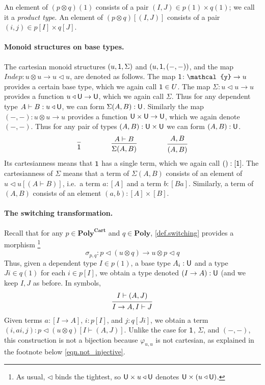 \documentclass[11pt, one side, article]{memoir}
\theoremstyle{definition}
\theoremstyle{plain}
\newcommand{\Cat}[1]{\mathbf{#1}}%
\newcommand{\Fun}[1]{\mathit{#1}}%
\newcommand{\tn}[1]{\textnormal{#1}}
\newcommand{\yon}{\mathcal{y}}
\newcommand{\poly}{\Cat{Poly}}
\newcommand{\polycart}{\poly^{\Cat{Cart}}}
\newcommand{\0}{\textsf{0}}
\newcommand{\1}{\tn{\textsf{1}}}
\newcommand{\U}{\tn{\textsf{U}}}
\newcommand{\tri}{\mathbin{\triangleleft}}
\newcommand{\indep}{\Fun{Indep}}
\begin{document}
An element of $(p\otimes q)(1)$ consists of a pair $(I,J)\in p(1)\times q(1)$; we call it a \emph{product type}. An element of $(p\otimes q)[(I,J)]$ consists of a pair $(i,j)\in p[I]\times q[J]$. 

\paragraph{Monoid structures on base types.}

The cartesian monoid structures $(u,\1,\Sigma)$ and $(u,\1,(-,-))$, and the map $\indep\colon u\otimes u\to u\tri u$, are denoted as follows. The map $\1\colon\yon\to u$ provides a certain base type, which we again call $\1\in U$. The map $\Sigma\colon u\tri u\to u$ provides a function $u\tri\U\to\U$, which we again call $\Sigma$. Thus for any dependent type $A\vdash B:u\tri\U$, we can form $\Sigma(A,B):\U$. Similarly the map $(-,-)\colon u\otimes u\to u$ provides a function $\U\times \U\to\U$, which we again denote $(-,-)$. Thus for any pair of types $(A,B):\U\times \U$ we can form $(A,B):\U$. 
\[
  \begin{prooftree}
    \Infer0{\1}
  \end{prooftree}
 \hspace{.6in}
  \begin{prooftree}
    \Hypo{A\vdash B}
    \Infer1{\Sigma(A,B)}
  \end{prooftree}
 \hspace{.6in} 
  \begin{prooftree}
    \Hypo{A, B}
    \Infer1{(A,B)}
  \end{prooftree}
\]
Its cartesianness means that $\1$ has a single term, which we again call $():[\1]$. The cartesianness of $\Sigma$ means that a term of $\Sigma(A,B)$ consists of an element of $u\tri u[(A\vdash B)]$, i.e.\ a term $a:[A]$ and a term $b:[Ba]$. Similarly, a term of $(A,B)$ consists of an element $(a,b):[A]\times[B]$.
\paragraph{The switching transformation.}

Recall that for any $p\in\polycart$ and $q\in\poly$, \cref{def.switching} provides a morphism%
\footnote{As usual, $\tri$ binds the tightest, so $\U\times u\tri \U$ denotes $\U\times(u\tri \U)$.}
\[\sigma_{p,q}\colon p\tri (u\otimes q)\to u\otimes p\tri q\]
Thus, given a dependent type $I\in p(1)$, a base type $A_i:\U$ and a type $J i\in q(1)$ for each $i\in p[I]$, we obtain a type denoted $(I\to A):\U$ (and we keep $I,J$ as before. In symbols,
\begin{equation*}
  \begin{prooftree}
    \Hypo{I\vdash (A, J)}
    \Infer1{I\to A, I\vdash J}
  \end{prooftree}
\end{equation*}
Given terms $a:[I\to A]$, $i:p[I]$, and $j:q[Ji]$, we obtain a term $(i,a i, j):p\tri(u\otimes q)[I\vdash (A,J)]$. Unlike the case for $\1$, $\Sigma$, and $(-,-)$, this construction is not a bijection because $\varphi_{u,u}$ is not cartesian, as explained in the footnote below \cref{eqn.not_injective}.
\end{document}
